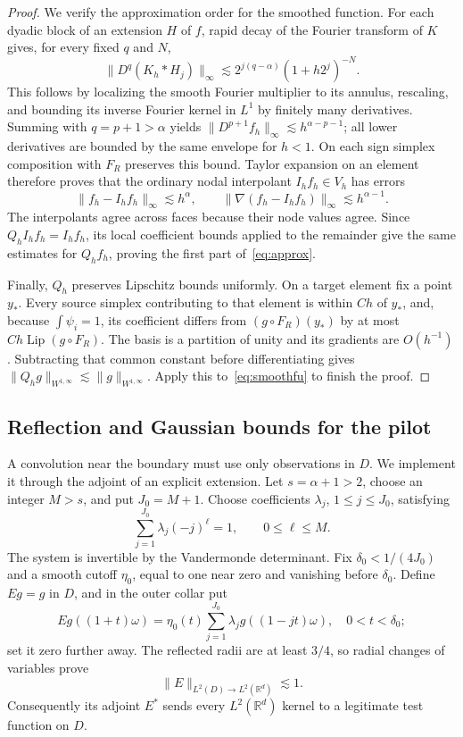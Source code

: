 \documentclass[11pt]{article}
\theoremstyle{remark}
\newcommand{\R}{\mathbb R}
\newcommand{\Lip}{\operatorname{Lip}}
\newcommand{\norm}[1]{\lVert #1\rVert}
\begin{document}
\begin{proof}
We verify the approximation order for the smoothed function. For each dyadic block of an extension $H$ of $f$, rapid decay of the Fourier transform of $K$ gives, for every fixed $q$ and $N$,
\[
 \norm{D^q(K_h*H_j)}_\infty
 \lesssim 2^{j(q-\alpha)}(1+h2^j)^{-N}.
\]
This follows by localizing the smooth Fourier multiplier to its annulus, rescaling, and bounding its inverse Fourier kernel in $L^1$ by finitely many derivatives. Summing with $q=p+1>\alpha$ yields
$\norm{D^{p+1}f_h}_\infty\lesssim h^{\alpha-p-1}$; all lower derivatives are bounded by the same envelope for $h<1$. On each sign simplex composition with $F_R$ preserves this bound. Taylor expansion on an element therefore proves that the ordinary nodal interpolant $I_hf_h\in V_h$ has errors
\[
 \norm{f_h-I_hf_h}_\infty\lesssim h^\alpha,
 \qquad \norm{\nabla(f_h-I_hf_h)}_\infty\lesssim h^{\alpha-1}.
\]
The interpolants agree across faces because their node values agree. Since $Q_hI_hf_h=I_hf_h$, its local coefficient bounds applied to the remainder give the same estimates for $Q_hf_h$, proving the first part of~\eqref{eq:approx}.

Finally, $Q_h$ preserves Lipschitz bounds uniformly. On a target element fix a point $y_*$. Every source simplex contributing to that element is within $Ch$ of $y_*$, and, because $\int\psi_i=1$, its coefficient differs from $(g\circ F_R)(y_*)$ by at most $Ch\Lip(g\circ F_R)$. The basis is a partition of unity and its gradients are $O(h^{-1})$. Subtracting that common constant before differentiating gives
$\norm{Q_hg}_{W^{1,\infty}}\lesssim\norm g_{W^{1,\infty}}$.
Apply this to~\eqref{eq:smoothfu} to finish the proof.
\end{proof}

\subsection{Reflection and Gaussian bounds for the pilot}
A convolution near the boundary must use only observations in $D$. We implement it through the adjoint of an explicit extension. Let $s=\alpha+1>2$, choose an integer $M>s$, and put $J_0=M+1$. Choose coefficients $\lambda_j$, $1\le j\le J_0$, satisfying
\[
 \sum_{j=1}^{J_0}\lambda_j(-j)^\ell=1,\qquad 0\le\ell\le M.
\]
The system is invertible by the Vandermonde determinant. Fix $\delta_0<1/(4J_0)$ and a smooth cutoff $\eta_0$, equal to one near zero and vanishing before $\delta_0$. Define $Eg=g$ in $D$, and in the outer collar put
\begin{equation}\label{eq:extension}
 Eg((1+t)\omega)=\eta_0(t)\sum_{j=1}^{J_0}\lambda_j g((1-jt)\omega),
 \quad 0<t<\delta_0;
\end{equation}
set it zero further away. The reflected radii are at least $3/4$, so radial changes of variables prove
\begin{equation}\label{eq:Ebounded}
 \norm E_{L^2(D)\to L^2(\R^d)}\lesssim1.
\end{equation}
Consequently its adjoint $E^*$ sends every $L^2(\R^d)$ kernel to a legitimate test function on $D$.
\end{document}

